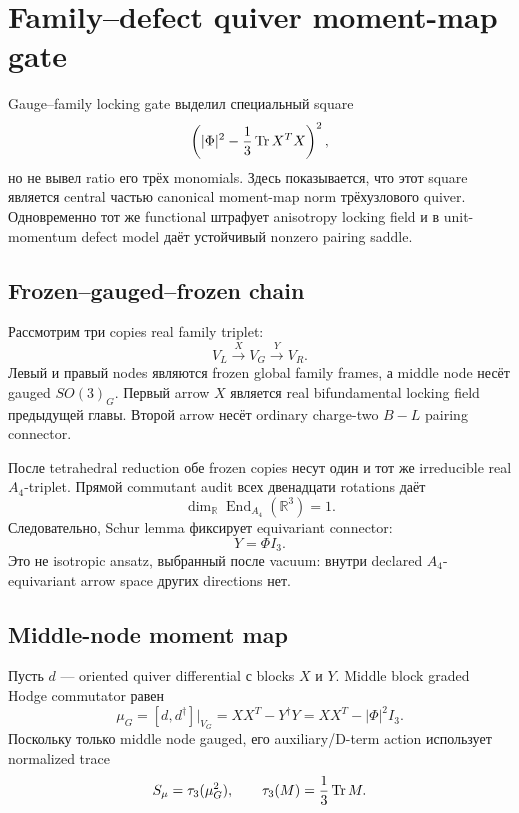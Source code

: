 \chapter{Family--defect quiver moment-map gate}

Gauge--family locking gate выделил специальный square
\begin{equation}
 \left(|\Phi|^2-\frac13\operatorname{Tr} X^TX\right)^2,
\end{equation}
но не вывел ratio его трёх monomials. Здесь показывается, что этот square
является central частью canonical moment-map norm трёхузлового quiver.
Одновременно тот же functional штрафует anisotropy locking field и в
unit-momentum defect model даёт устойчивый nonzero pairing saddle.

\section{Frozen--gauged--frozen chain}

Рассмотрим три copies real family triplet:
\begin{equation}
 V_L\xrightarrow{\ X\ }V_G\xrightarrow{\ Y\ }V_R.
 \label{eq:family-moment-map-quiver}
\end{equation}
Левый и правый nodes являются frozen global family frames, а middle node
несёт gauged \(SO(3)_G\). Первый arrow \(X\) является real
bifundamental locking field предыдущей главы. Второй arrow несёт ordinary
charge-two \(B-L\) pairing connector.

После tetrahedral reduction обе frozen copies несут один и тот же
irreducible real \(A_4\)-triplet. Прямой commutant audit всех двенадцати
rotations даёт
\begin{equation}
 \dim_{\mathbb R}\operatorname{End}_{A_4}(\mathbb R^3)=1.
\end{equation}
Следовательно, Schur lemma фиксирует equivariant connector:
\begin{equation}
 Y=\Phi I_3.
 \label{eq:a4-schur-pairing-connector}
\end{equation}
Это не isotropic ansatz, выбранный после vacuum: внутри declared
\(A_4\)-equivariant arrow space других directions нет.

\section{Middle-node moment map}

Пусть \(d\) --- oriented quiver differential с blocks \(X\) и \(Y\).
Middle block graded Hodge commutator равен
\begin{equation}
 \mu_G
 =[d,d^\dagger]\big|_{V_G}
 =XX^T-Y^\dagger Y
 =XX^T-|\Phi|^2I_3.
 \label{eq:middle-quiver-moment-map}
\end{equation}
Поскольку только middle node gauged, его auxiliary/D-term action использует
normalized trace
\begin{equation}
 S_\mu=\tau_3(\mu_G^2),
 \qquad
 \tau_3(M)=\frac13\operatorname{Tr} M.
 \label{eq:normalized-middle-moment-action}
\end{equation}


